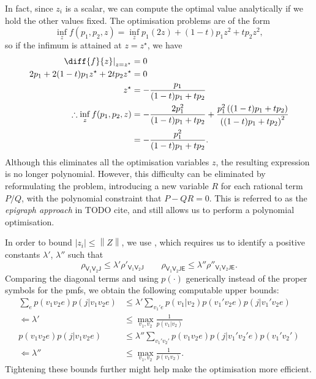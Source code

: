 \documentclass[10pt, a4paper]{article}
\numberwithin{equation}{section} %
\theoremstyle{definition}
\theoremstyle{plain}
\newcommand{\norm}[1]{\left\lVert#1\right\rVert}
\newcommand{\abs}[1]{\left\lvert#1\right\rvert}
\newcommand{\?}{\mathrel{?}} %
\newcommand{\crv}[1]{\mathsf{#1}}
\begin{document}
    In fact, since \(z_i\) is a scalar, we can compute the optimal value analytically if we hold the other values fixed. The optimisation problems are of the form
    \begin{equation}
      \inf_z f(p_1, p_2, z) = \inf_z p_1(2z) + (1-t) p_1 z^2 + t p_2 z^2,
    \end{equation}
    so if the infimum is attained at \(z=z^{\star}\), we have
    \begin{align}
      \left. \diff{f}{z} \right|_{z=z^{\star}} &= 0 \\
      2p_1 + 2(1-t) p_1 z^{\star} + 2t p_2 z^{\star} &= 0 \\
      z^{\star} &= -\frac{p_1}{(1-t)p_1 + tp_2} \\
      \therefore \inf_z f(p_1, p_2, z) &= -\frac{2p_1^2}{(1-t)p_1 + tp_2} + \frac{p_1^2 \left( (1-t)p_1 + tp_2 \right)}{{\left((1-t)p_1 + tp_2\right)}^2} \\
                                       &= -\frac{p_1^2}{(1-t)p_1 + tp_2}.
    \end{align}
    Although this eliminates all the optimisation variables \(z\), the resulting expression is no longer polynomial. However, this difficulty can be eliminated by reformulating the problem, introducing a new variable \(R\) for each rational term \(P/Q\), with the polynomial constraint that \(P - QR = 0\). This is referred to as the \emph{epigraph approach} in TODO cite, and still allows us to perform a polynomial optimisation.



    In order to bound \(\abs{z_i} \leq \norm{Z}\), we use , which requires us to identify a positive constants \(\lambda'\), \(\lambda''\) such that
      \[ \rho_{\crv{V}_1\crv{V}_2\crv{J}} \leq \lambda' \rho'_{\crv{V}_1\crv{V}_2\crv{J}} \qquad \rho_{\crv{V}_1\crv{V}_2\crv{JE}} \leq \lambda'' \rho''_{\crv{V}_1\crv{V}_2\crv{JE}}. \]
    Comparing the diagonal terms and using \(p(\cdot)\) generically instead of the proper symbols for the pmfs, we obtain the following computable upper bounds:
    \begin{align}
      \sum_{e} p(v_1v_2e) p(j|v_1v_2e) &\leq \lambda' \sum_{v_1' e} p(v_1|v_2) p(v_1'v_2e) p(j|v_1'v_2e) \\
      \Leftarrow \lambda' &\leq \max_{v_1,v_2} \frac{1}{p(v_1|v_2)} \\
      p(v_1v_2e) p(j|v_1v_2e) &\leq \lambda'' \sum_{v_1' v_2'} p(v_1v_2e) p(j|v_1'v_2'e) p(v_1'v_2') \\
      \Leftarrow \lambda'' &\leq \max_{v_1,v_2} \frac{1}{p(v_1 v_2)}.
    \end{align}
    Tightening these bounds further might help make the optimisation more efficient.
\end{document}
